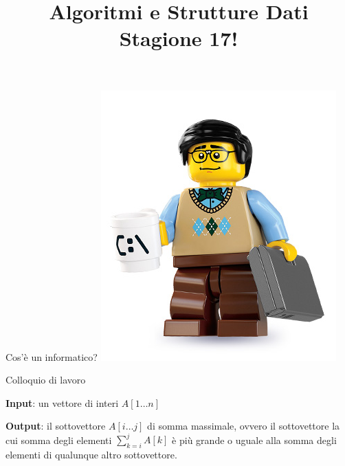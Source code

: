 

\usepackage{epigraph}
\usepackage{listings}
\usepackage{colortbl}


\newcommand{\Sum}{\mathit{sum}}
\newcommand{\MaxSoFar}{\mathit{maxSoFar}}
\newcommand{\MaxEndingHere}{\mathit{maxEndingHere}}

\newcommand*{\RC}[1]{\hfill\makebox[3.0cm][l]{#1}}%


\title[ASD - Introduzione]{\textbf{Algoritmi e Strutture Dati}\\[24pt]
Stagione 17!}

\graphicspath{{figs/00/}}



\FrameTitle{}



\begin{frame}{Cos'è un informatico?}
\includegraphics[height=0.8\paperheight]{geek.jpg}	
\end{frame}

\begin{frame}{Colloquio di lavoro}
	
\vspace{-9pt}
\begin{myboxtitle}
\BI
\item \textbf{Input}: un vettore di interi $A[1 \ldots n]$
\item \textbf{Output}: il sottovettore $A[i \ldots j]$ di somma massimale,
ovvero il sottovettore la cui somma degli elementi $\sum_{k=i}^j A[k]$ è
più grande o uguale alla somma degli elementi di qualunque altro sottovettore.
\EI
\end{myboxtitle}
\end{frame}

